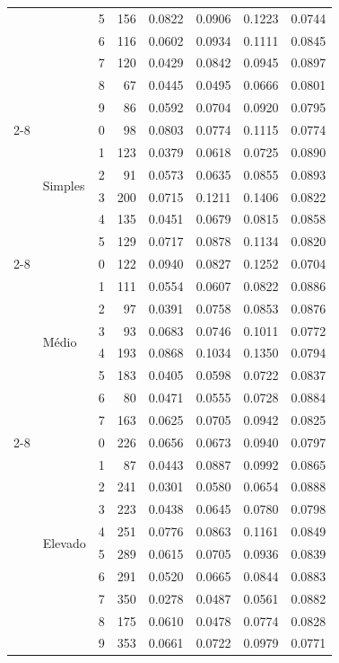 \begin{table}[htbp]
\begin{tabular}{llrrrrrr}
     &  & 5 & 156 & 0.0822 & 0.0906 & 0.1223 & 0.0744 \\
     &  & 6 & 116 & 0.0602 & 0.0934 & 0.1111 & 0.0845 \\
     &  & 7 & 120 & 0.0429 & 0.0842 & 0.0945 & 0.0897 \\
     &  & 8 & 67 & 0.0445 & 0.0495 & 0.0666 & 0.0801 \\
     &  & 9 & 86 & 0.0592 & 0.0704 & 0.0920 & 0.0795 \\
    \cmidrule(lr){2-8}
     & \multirow{6}{*}{Simples} & 0 & 98 & 0.0803 & 0.0774 & 0.1115 & 0.0774 \\
     &  & 1 & 123 & 0.0379 & 0.0618 & 0.0725 & 0.0890 \\
     &  & 2 & 91 & 0.0573 & 0.0635 & 0.0855 & 0.0893 \\
     &  & 3 & 200 & 0.0715 & 0.1211 & 0.1406 & 0.0822 \\
     &  & 4 & 135 & 0.0451 & 0.0679 & 0.0815 & 0.0858 \\
     &  & 5 & 129 & 0.0717 & 0.0878 & 0.1134 & 0.0820 \\
    \cmidrule(lr){2-8}
     & \multirow{8}{*}{M\'edio} & 0 & 122 & 0.0940 & 0.0827 & 0.1252 & 0.0704 \\
     &  & 1 & 111 & 0.0554 & 0.0607 & 0.0822 & 0.0886 \\
     &  & 2 & 97 & 0.0391 & 0.0758 & 0.0853 & 0.0876 \\
     &  & 3 & 93 & 0.0683 & 0.0746 & 0.1011 & 0.0772 \\
     &  & 4 & 193 & 0.0868 & 0.1034 & 0.1350 & 0.0794 \\
     &  & 5 & 183 & 0.0405 & 0.0598 & 0.0722 & 0.0837 \\
     &  & 6 & 80 & 0.0471 & 0.0555 & 0.0728 & 0.0884 \\
     &  & 7 & 163 & 0.0625 & 0.0705 & 0.0942 & 0.0825 \\
    \cmidrule(lr){2-8}
     & \multirow{10}{*}{Elevado} & 0 & 226 & 0.0656 & 0.0673 & 0.0940 & 0.0797 \\
     &  & 1 & 87 & 0.0443 & 0.0887 & 0.0992 & 0.0865 \\
     &  & 2 & 241 & 0.0301 & 0.0580 & 0.0654 & 0.0888 \\
     &  & 3 & 223 & 0.0438 & 0.0645 & 0.0780 & 0.0798 \\
     &  & 4 & 251 & 0.0776 & 0.0863 & 0.1161 & 0.0849 \\
     &  & 5 & 289 & 0.0615 & 0.0705 & 0.0936 & 0.0839 \\
     &  & 6 & 291 & 0.0520 & 0.0665 & 0.0844 & 0.0883 \\
     &  & 7 & 350 & 0.0278 & 0.0487 & 0.0561 & 0.0882 \\
     &  & 8 & 175 & 0.0610 & 0.0478 & 0.0774 & 0.0828 \\
     &  & 9 & 353 & 0.0661 & 0.0722 & 0.0979 & 0.0771 \\
    \bottomrule
  \end{tabular}
\end{table}
